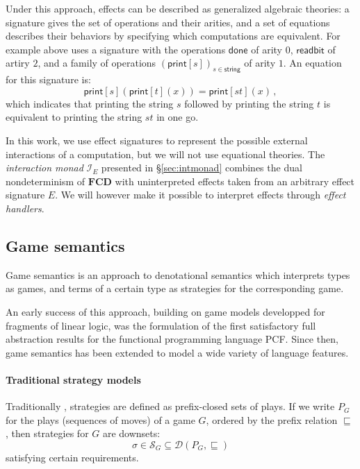\documentclass[format=sigplan,authordraft]{acmart}
\newcommand{\kw}[1]{\ensuremath{ \mathsf{#1} }}
\begin{document}
Under this approach,
effects can be described as generalized algebraic theories:
a signature gives the set of operations and their arities,
and a set of equations describes their behaviors
by specifying which computations are equivalent.
For example above uses a signature with the operations
$\kw{done}$ of arity $0$,
$\kw{readbit}$ of artiry $2$,
and a family of operations $(\kw{print}[s])_{s \in \kw{string}}$
of arity $1$.
An equation for this signature is:
\[
    \kw{print}[s](\kw{print}[t](x)) =
    \kw{print}[st](x) \,,
\]
which indicates that
printing the string $s$ followed by
printing the string $t$ is equivalent to
printing the string $st$ in one go.

In this work,
we use effect signatures to represent
the possible external interactions
of a computation,
but we will not use equational theories.
The \emph{interaction monad} $\mathcal{I}_E$
presented in \S\ref{sec:intmonad}
combines the dual nondeterminism of $\mathbf{FCD}$ with
uninterpreted effects taken from
an arbitrary effect signature $E$.
We will however make it possible to interpret effects through
\emph{effect handlers}.


\subsection{Game semantics} \label{sec:strat} %

Game semantics is an approach to denotational semantics
which interprets types as games, and
terms of a certain type as
strategies for the corresponding game.

An early success of this approach,
building on game models developped for
fragments of linear logic,
was the formulation of the first satisfactory
full abstraction results
for the functional programming language PCF.
Since then,
game semantics has been extended to
model a wide variety of language features.

\paragraph{Traditional strategy models} %

Traditionally \cite{gamesem99},
strategies are defined as
prefix-closed sets of plays.
If we write $P_G$ for the plays (sequences of moves) of a game $G$,
ordered by the prefix relation $\sqsubseteq$,
then strategies for $G$ are downsets:
\[
    \sigma \in
      \mathcal{S}_G \subseteq
      \mathcal{D}(P_G, {\sqsubseteq})
\]
satisfying certain requirements.
\end{document}
